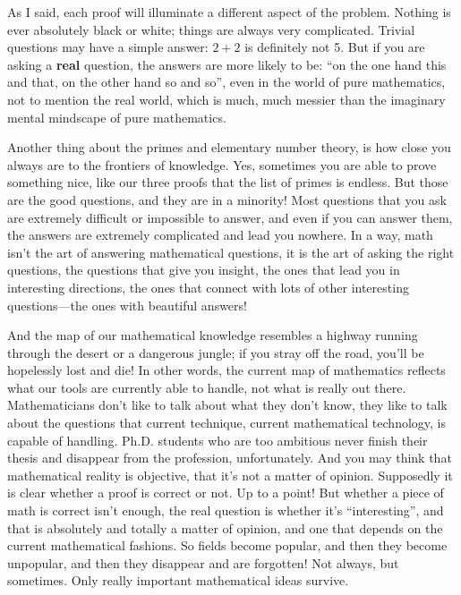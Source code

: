 \documentclass[12pt]{book}
\begin{document}
As I said,
each proof will illuminate a different aspect of the problem. Nothing is ever 
absolutely black or white; things are always very complicated.  
Trivial questions may have a simple answer: $2 + 2$ is definitely not 5.
But if you are asking a \textbf{real} question, 
the answers are more likely to be: ``on the one hand this and that, on 
the other hand so and so'', even in the world of pure mathematics, 
not to mention the real world, which is 
much, much messier than the imaginary mental mindscape of pure mathematics.

Another thing about the primes and elementary number theory, is how close you always are
to the frontiers of knowledge. Yes, sometimes you are able to prove something nice, like our
three proofs that the list of primes is endless.  But those are the good questions, and
they are in a minority!  Most questions that you ask are extremely difficult or impossible to answer,
and even if you can answer them, the answers are extremely complicated and lead you nowhere.
In a way, math isn't the art of answering mathematical questions, it is the art of asking
the right questions, the questions that give you insight, the ones that lead you 
in interesting directions, the ones that connect with lots of other interesting questions---the
ones with beautiful answers!

And the map of our mathematical knowledge resembles a highway running through the desert or a
dangerous jungle;
if you stray off the road, you'll be hopelessly lost and die!  In other words, the current
map of mathematics reflects what our tools are currently able to handle, not what is really out there.
Mathematicians don't like to talk about what they don't know, they like to talk about the questions
that current technique, current mathematical technology, is capable of handling.  
Ph.D. students who are too
ambitious never finish their thesis and disappear from the profession, unfortunately.
And you may think that mathematical reality is objective, that it's not a matter of opinion. 
Supposedly
it is clear whether a proof is correct or not. Up to a point!  But whether a piece of math
is correct isn't enough, the real
question is whether it's ``interesting'', and that
is absolutely and totally a matter
of opinion, and one that depends on the current mathematical fashions.  So fields become popular,
and then they become unpopular, and then they disappear and are forgotten! Not always, but sometimes.
Only really important mathematical ideas survive.
\end{document}
